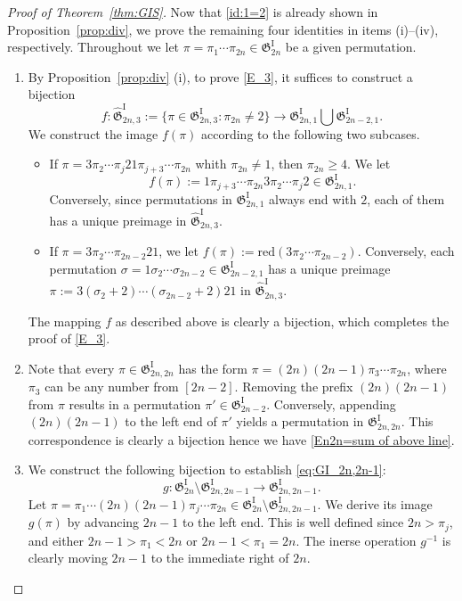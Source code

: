 \documentclass[11pt,reqno]{amsart}
\numberwithin{equation}{section}
\theoremstyle{plain}
\theoremstyle{definition}
\newcommand{\fG}{\mathfrak{G}}
\newcommand{\GI}{\fG^{\mathrm{I}}}
\newcommand{\tGI}{\widehat{\fG}^{\mathrm{I}}}
\begin{document}
\begin{proof}[Proof of Theorem~\ref{thm:GIS}]
	Now that \eqref{id:1=2} is already shown in Proposition~\ref{prop:div}, we prove the remaining four identities in items (i)--(iv), respectively. Throughout we let $\pi =\pi_1 \cdots \pi_{2n} \in \GI_{2n}$ be a given permutation.
	\begin{enumerate}[label=(\roman*)]		
		\item By Proposition~\ref{prop:div} (i), to prove \eqref{E_3}, it suffices to construct a bijection
		$$f: \tGI_{2n,3}:=\{\pi\in\GI_{2n,3}: \pi_{2n}\neq 2\}\to \GI_{2n,1}\bigcup\GI_{2n-2,1}.$$
		We construct the image $f(\pi)$ according to the following two subcases. 
		\begin{itemize}
			\item If $\pi = 3 \pi_2 \cdots  \pi_{j} 21 \pi_{j+3} \cdots \pi_{2n}$ whith $\pi_{2n}\neq 1$, then $\pi_{2n} \ge 4$. We let
			$$f(\pi) := 1\pi_{j+3}\cdots \pi_{2n}3 \pi_2 \cdots \pi_{j}2\in \GI_{2n,1}.$$
			Conversely, since permutations in $\GI_{2n,1}$ always end with $2$, each of them has a unique preimage in $\tGI_{2n,3}$. 
			\item If $\pi =3 \pi_2  \cdots \pi_{2n-2}21$, we let $f(\pi):=\mathrm{red}(3 \pi_2 \cdots \pi_{2n-2})$. Conversely, each permutation $\sigma=1\sigma_2\cdots\sigma_{2n-2}\in\GI_{2n-2,1}$ has a unique preimage $\pi:=3(\sigma_2+2)\cdots(\sigma_{2n-2}+2)21$ in $\tGI_{2n,3}$.
		\end{itemize}
		The mapping $f$ as described above is clearly a bijection, which completes the proof of \eqref{E_3}.
		
		\item Note that every $\pi \in \GI_{2n,2n}$ has the form $\pi = (2n)(2n-1)\pi_3\cdots \pi_{2n}$, where $\pi_3$ can be any number from $[2n-2]$. Removing the prefix $(2n)(2n-1)$ from $\pi $ results in a permutation $\pi'\in\GI_{2n-2}$. Conversely, appending $(2n)(2n-1)$ to the left end of $\pi'$ yields a permutation in $\GI_{2n,2n}$. This correspondence is clearly a bijection hence we have \eqref{En2n=sum of above line}.
		
		\item We construct the following bijection to establish \eqref{eq:GI_2n,2n-1}:
		$$g: \GI_{2n}\setminus\GI_{2n,2n-1} \to \GI_{2n,2n-1}.$$
		Let $\pi=\pi_1\cdots (2n)(2n-1)\pi_j \cdots\pi_{2n} \in \GI_{2n}\setminus\GI_{2n,2n-1}$. We derive its image $g(\pi)$ by advancing $2n-1$ to the left end. This is well defined since $2n>\pi_{j}$, and either $2n-1>\pi_1<2n$ or $2n-1<\pi_1=2n$. The inerse operation $g^{-1}$ is clearly moving $2n-1$ to the immediate right of $2n$.
		

\end{enumerate}
\end{proof}
\end{document}
